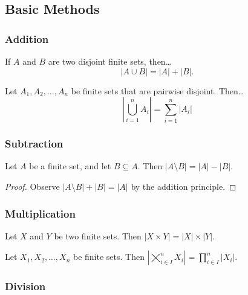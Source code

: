 \subsection{Basic Methods}\label{basiccombinatorics}

\subsubsection{Addition}\label{addition}

\begin{theorem}
If $A$ and $B$ are two disjoint finite sets, then\dots
$$|A \cup B| = |A| + |B|.$$
\end{theorem}

\begin{theorem}
Let $A_1,A_2,\dots,A_n$ be finite sets that are pairwise disjoint. Then\dots
$$|\bigcup_{i=1}^nA_i| = \sum_{i=1}^n |A_i|$$
\end{theorem}

\subsubsection{Subtraction}\label{subtraction}

\begin{theorem}
Let $A$ be a finite set, and let $B \subseteq A$. Then $|A \setminus B|=|A|-|B|$.
\end{theorem}

\begin{proof}
Observe $|A \setminus B|+|B| = |A|$ by the addition principle.
\end{proof}

\subsubsection{Multiplication}\label{multiplication}

\begin{theorem} 
Let $X$ and $Y$ be two finite sets. Then $|X \times Y| = |X| \times |Y|$.
\end{theorem}

\begin{theorem}
Let $X_1,X_2,\dots,X_n$ be finite sets. Then $|\bigtimes_{i \in I}^{n} X_i| = \prod_{i \in I}^{n} |X_i|$.
\end{theorem}

\subsubsection{Division}\label{division}

